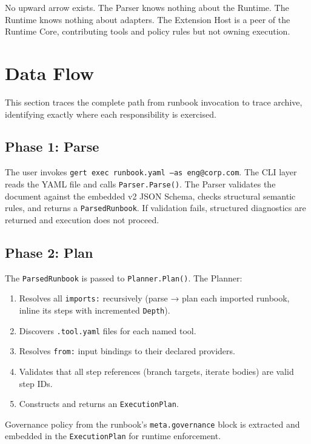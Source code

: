 No upward arrow exists. The Parser knows nothing about the Runtime. The Runtime knows nothing
about adapters. The Extension Host is a peer of the Runtime Core, contributing tools and policy
rules but not owning execution.

\section{Data Flow}

This section traces the complete path from runbook invocation to trace archive, identifying
exactly where each responsibility is exercised.

\subsection{Phase 1: Parse}

The user invokes \texttt{gert exec runbook.yaml --as eng@corp.com}. The CLI layer reads the
YAML file and calls \texttt{Parser.Parse()}. The Parser validates the document against the
embedded v2 JSON Schema, checks structural semantic rules, and returns a \texttt{ParsedRunbook}.
If validation fails, structured diagnostics are returned and execution does not proceed.

\subsection{Phase 2: Plan}

The \texttt{ParsedRunbook} is passed to \texttt{Planner.Plan()}. The Planner:
\begin{enumerate}
  \item Resolves all \texttt{imports:} recursively (parse → plan each imported runbook, inline
        its steps with incremented \texttt{Depth}).
  \item Discovers \texttt{.tool.yaml} files for each named tool.
  \item Resolves \texttt{from:} input bindings to their declared providers.
  \item Validates that all step references (branch targets, iterate bodies) are valid step IDs.
  \item Constructs and returns an \texttt{ExecutionPlan}.
\end{enumerate}

Governance policy from the runbook's \texttt{meta.governance} block is extracted and embedded
in the \texttt{ExecutionPlan} for runtime enforcement.

